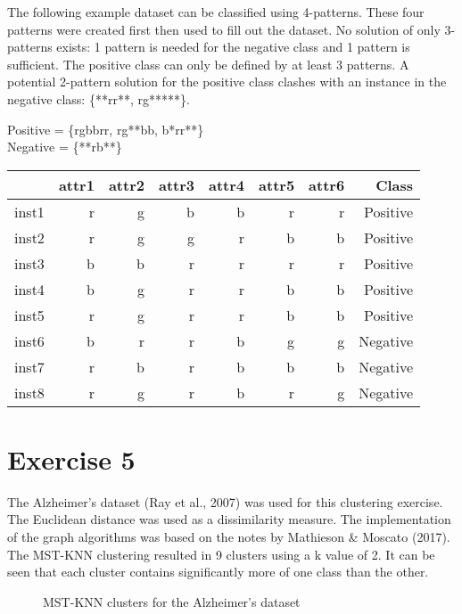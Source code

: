 \documentclass[11pt, a4paper]{article}
\begin{document}
The following example dataset can be classified using 4-patterns. These four patterns were created first then used to fill out the dataset. No solution of only 3-patterns exists: 1 pattern is needed for the negative class and 1 pattern is sufficient. The positive class can only be defined by at least 3 patterns. A potential 2-pattern solution for the positive class clashes with an instance in the negative class: \{**rr**, rg*****\}.

\begin{center}
Positive =  \{rgbbrr, rg**bb, b*rr**\}\\
Negative = \{**rb**\}
\end{center}

\begin{center}
\begin{tabular}{|l|r|r|r|r|r|r|r|}
\hline
& attr1	& attr2	& attr3	& attr4	& attr5	& attr6	& Class\\
\hline
inst1 & r & g & b & b & r & r & Positive\\
\hline
inst2 & r & g & g & r & b & b & Positive\\
\hline
inst3 & b & b & r & r & r & r & Positive\\
\hline
inst4 & b & g & r & r & b & b & Positive\\
\hline
inst5 & r & g & r & r & b & b & Positive\\
\hline
inst6 & b & r & r & b & g & g & Negative\\
\hline
inst7 & r & b & r & b & b & b & Negative\\
\hline
inst8 & r & g & r & b & r & g & Negative\\
\hline
\end{tabular}
\end{center}

\section{Exercise 5}
The Alzheimer's dataset (Ray et al., 2007) was used for this clustering exercise. The Euclidean distance was used as a dissimilarity measure. The implementation of the graph algorithms was based on the notes by Mathieson \& Moscato (2017). The MST-KNN clustering resulted in 9 clusters using a k value of 2. It can be seen that each cluster contains significantly more of one class than the other.

\begin{figure}[H]
\caption{MST-KNN clusters for the Alzheimer's dataset}\label{fig5a}
\end{figure}
\end{document}
